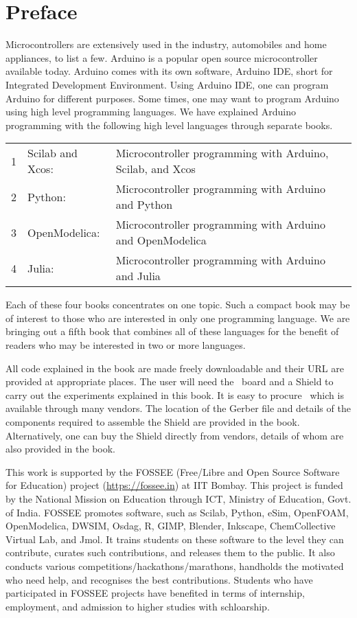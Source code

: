 \chapter*{Preface}
Microcontrollers are extensively used in the
industry, automobiles and home appliances, to list a few. 
Arduino is a popular open source microcontroller available today.
Arduino comes with its own software, Arduino IDE, short for Integrated
Development Environment.  Using Arduino IDE, one can program Arduino
for different purposes.  Some times, one may want to program Arduino
using high level programming languages.  We have explained Arduino
programming with the following high level languages through separate
books. 
\begin{center}
\begin{tabular}{llp{5.5cm}}
1 & Scilab and Xcos: & Microcontroller programming with Arduino,
Scilab, and Xcos \\
2 & Python: & Microcontroller programming with Arduino and Python \\
3 & OpenModelica: & Microcontroller programming with Arduino and
OpenModelica \\ 
4 & Julia: & Microcontroller programming with Arduino and Julia \\
\end{tabular}
\end{center}

Each of these four books concentrates on one topic.  Such a compact
book may be of interest to those who are interested in only one
programming language.  We are bringing out a fifth book that combines
all of these languages for the benefit of readers 
who may be interested in two or more languages.

All code explained in the book are made freely downloadable and their
URL are provided at appropriate places.  The user will need the
\arduino\ board and a Shield to carry out the experiments explained
in this book.  It is easy to procure \arduino\, which is available
through many vendors.  The location of the Gerber file and details of
the components required to assemble the Shield are provided in the
book.  Alternatively, one can buy the Shield directly from vendors,
details of whom are also provided in the book.

This work is supported by the FOSSEE (Free/Libre and Open Source
Software for Education) project (\url{https://fossee.in}) at IIT
Bombay.  This project is funded by the National Mission on Education
through ICT, Ministry of Education, Govt. of India.  FOSSEE promotes
software, such as Scilab, Python, eSim, OpenFOAM, OpenModelica, DWSIM,
Osdag, R, GIMP, Blender, Inkscape, ChemCollective Virtual Lab, and
Jmol.  It trains students on these software to the level they can
contribute, curates such contributions, and releases them to the
public.  It also conducts various competitions/hackathons/marathons,
handholds the motivated who need help, and recognises the best
contributions.  Students who have participated in FOSSEE projects have
benefited in terms of internship, employment, and admission to higher
studies with schloarship.

